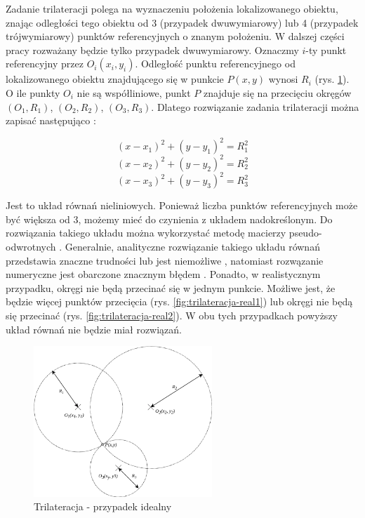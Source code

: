 Zadanie trilateracji polega na wyznaczeniu położenia lokalizowanego obiektu, znając odległości tego obiektu od 3 (przypadek dwuwymiarowy) lub 4 (przypadek trójwymiarowy) punktów referencyjnych o znanym położeniu. W dalszej części pracy rozważany będzie tylko przypadek dwuwymiarowy. Oznaczmy $i$-ty punkt referencyjny przez $O_i(x_i, y_i)$. Odległość punktu referencyjnego od lokalizowanego obiektu znajdującego się w punkcie $P(x,y)$ wynosi $R_i$ (rys. \ref{fig:trilateracja-ideal}). O ile punkty $O_i$ nie są współliniowe, punkt $P$ znajduje się na przecięciu okręgów $(O_1, R_1)$, $(O_2, R_2)$, $(O_3, R_3)$. Dlatego rozwiązanie zadania trilateracji można zapisać następująco \cite{trilat_przeglad}:

\begin{equation}
\label{eq:trilateracja1}
 (x - x_1)^2 + (y-y_1)^2 = R_1^2
\end{equation}
\begin{equation}
 (x - x_2)^2 + (y-y_2)^2 = R_2^2
\end{equation}
\begin{equation}
\label{eq:trilateracja3}
 (x - x_3)^2 + (y-y_3)^2 = R_3^2
\end{equation}

Jest to układ równań nieliniowych. Ponieważ liczba punktów referencyjnych może być większa od 3, możemy mieć do czynienia z układem nadokreślonym. Do rozwiązania takiego układu można wykorzystać metodę macierzy pseudo-odwrotnych \cite{trilat_particle}. Generalnie, analityczne rozwiązanie takiego układu równań przedstawia znaczne trudności lub jest niemożliwe \cite{trilat_przeglad}, natomiast rozwązanie numeryczne jest obarczone znacznym błędem \cite{trilat_particle}. Ponadto, w realistycznym przypadku, okręgi nie będą przecinać się w jednym punkcie. Możliwe jest, że będzie więcej punktów przecięcia (rys. \ref{fig:trilateracja-real1}) lub okręgi nie będą się przecinać (rys. \ref{fig:trilateracja-real2}). W obu tych przypadkach powyższy układ równań nie będzie miał rozwiązań. 


\begin{figure}[h]
\centering
\includegraphics[width=0.6\textwidth]{img/trilateracja-okregi1.png}
\caption{Trilateracja - przypadek idealny}
\label{fig:trilateracja-ideal}
\end{figure}

